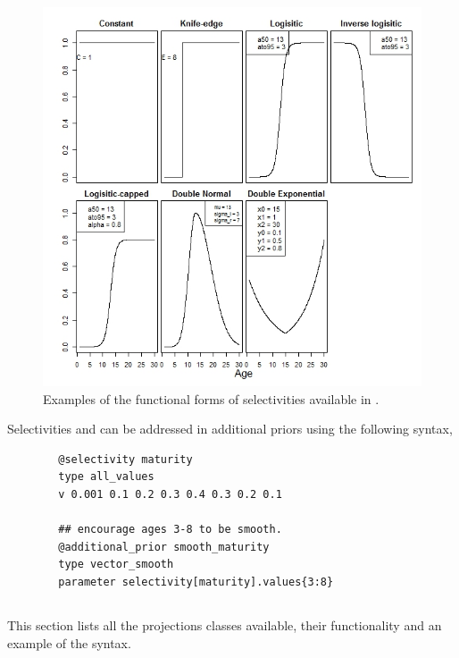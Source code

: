 \begin{figure}[H]
	\includegraphics[scale = 0.7]{Figures/Selectivities.jpeg}
	\caption{Examples of the functional forms of selectivities available in \CNAME.}
\end{figure}

Selectivities  and  can be addressed in additional priors using the following syntax,

{\small{\begin{verbatim}
		@selectivity maturity
		type all_values
		v 0.001 0.1 0.2 0.3 0.4 0.3 0.2 0.1

		## encourage ages 3-8 to be smooth.
		@additional_prior smooth_maturity
		type vector_smooth
		parameter selectivity[maturity].values{3:8}

		\end{verbatim}}}

\subsection{\label{sec:projections}}

This section lists all the projections classes available, their functionality and an example of the syntax.

\subsubsection[Constant]{}

